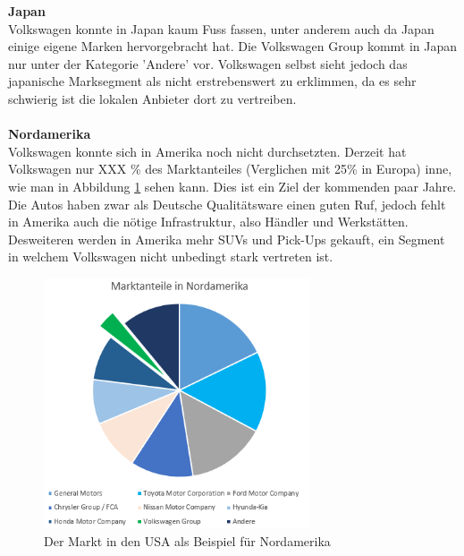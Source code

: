 \documentclass[12pt]{article}
\begin{document}
\textbf{Japan} \\
Volkswagen konnte in Japan kaum Fuss fassen, unter anderem auch da Japan einige eigene Marken hervorgebracht hat.  Die Volkswagen Group kommt in Japan nur unter der Kategorie 'Andere' vor. Volkswagen selbst sieht jedoch das japanische Marksegment als nicht erstrebenswert zu erklimmen, da es sehr schwierig ist die lokalen Anbieter dort zu vertreiben.
\\\\
\textbf{Nordamerika}\\
Volkswagen konnte sich in Amerika noch nicht durchsetzten. Derzeit hat Volkswagen nur XXX \% des Marktanteiles (Verglichen mit 25\% in Europa) inne, wie man in Abbildung \ref{fig:marktnordamerika} sehen kann. Dies ist ein Ziel der kommenden paar Jahre. Die Autos haben zwar als Deutsche Qualitätsware einen guten Ruf, jedoch fehlt in Amerika auch die nötige Infrastruktur, also Händler und Werkstätten. \\ Desweiteren werden in Amerika mehr SUVs und Pick-Ups gekauft, ein Segment in welchem Volkswagen nicht unbedingt stark vertreten ist.
\begin{figure}[here!]
\centering
\includegraphics[width=0.7\textwidth]{images/maam}
\caption{Der Markt in den USA als Beispiel für Nordamerika}
\label{fig:marktnordamerika}
\end{figure}\FloatBarrier
\noindent
\end{document}
